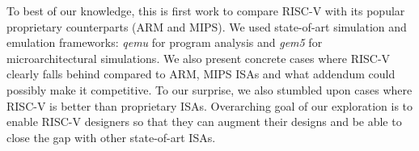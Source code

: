 
\label{sec:conc}
To best of our knowledge, this is first work to compare RISC-V with its popular proprietary counterparts (ARM and MIPS). We used state-of-art simulation and emulation frameworks: \textit{qemu} for program analysis and \textit{gem5} for microarchitectural simulations. We also present concrete cases where RISC-V clearly falls behind compared to ARM, MIPS ISAs and what addendum could possibly make it competitive. To our surprise, we also stumbled upon cases where RISC-V is better than proprietary ISAs. Overarching goal of our exploration is to enable RISC-V designers so that they can augment their designs and be able to close the gap with other state-of-art ISAs.
